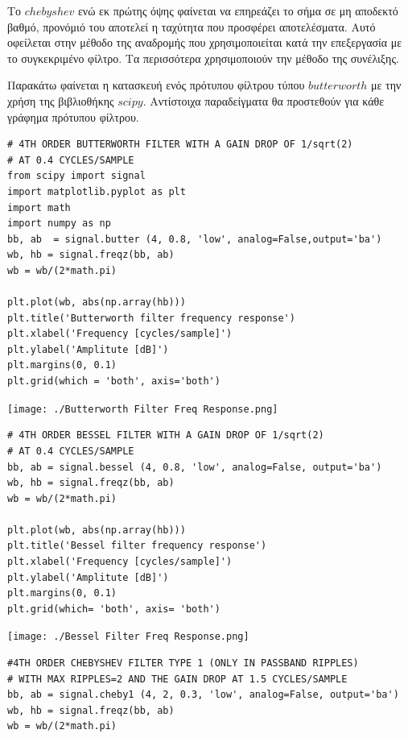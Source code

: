 \documentclass[breaklines=true, 12pt]{article}
\begin{document}
{{{Το \(chebyshev\) ενώ εκ πρώτης όψης φαίνεται να επηρεάζει το σήμα σε μη
αποδεκτό βαθμό, προνόμιό του αποτελεί η ταχύτητα που προσφέρει αποτελέσματα.
Αυτό οφείλεται στην μέθοδο της αναδρομής που χρησιμοποιείται κατά την επεξεργασία
με το συγκεκριμένο φίλτρο. Τα περισσότερα χρησιμοποιούν την μέθοδο της συνέλιξης.

Παρακάτω φαίνεται η κατασκευή ενός πρότυπου φίλτρου τύπου \(butterworth\) με την χρήση
της βιβλιοθήκης \(scipy\). Αντίστοιχα παραδείγματα θα προστεθούν για κάθε γράφημα
πρότυπου φίλτρου.

\begin{verbatim}
# 4TH ORDER BUTTERWORTH FILTER WITH A GAIN DROP OF 1/sqrt(2)
# AT 0.4 CYCLES/SAMPLE
from scipy import signal
import matplotlib.pyplot as plt
import math
import numpy as np
bb, ab  = signal.butter (4, 0.8, 'low', analog=False,output='ba')
wb, hb = signal.freqz(bb, ab)
wb = wb/(2*math.pi)

plt.plot(wb, abs(np.array(hb)))
plt.title('Butterworth filter frequency response')
plt.xlabel('Frequency [cycles/sample]')
plt.ylabel('Amplitute [dB]')
plt.margins(0, 0.1)
plt.grid(which = 'both', axis='both')
\end{verbatim}

\begin{center}
\texttt{[image: ./Butterworth Filter Freq Response.png]}
\end{center}


\begin{verbatim}
# 4TH ORDER BESSEL FILTER WITH A GAIN DROP OF 1/sqrt(2)
# AT 0.4 CYCLES/SAMPLE
bb, ab = signal.bessel (4, 0.8, 'low', analog=False, output='ba')
wb, hb = signal.freqz(bb, ab)
wb = wb/(2*math.pi)

plt.plot(wb, abs(np.array(hb)))
plt.title('Bessel filter frequency response')
plt.xlabel('Frequency [cycles/sample]')
plt.ylabel('Amplitute [dB]')
plt.margins(0, 0.1)
plt.grid(which= 'both', axis= 'both')
\end{verbatim}

\begin{center}
\texttt{[image: ./Bessel Filter Freq Response.png]}
\end{center}

\begin{verbatim}
#4TH ORDER CHEBYSHEV FILTER TYPE 1 (ONLY IN PASSBAND RIPPLES)
# WITH MAX RIPPLES=2 AND THE GAIN DROP AT 1.5 CYCLES/SAMPLE
bb, ab = signal.cheby1 (4, 2, 0.3, 'low', analog=False, output='ba')
wb, hb = signal.freqz(bb, ab)
wb = wb/(2*math.pi)


\end{verbatim}}}}
\end{document}
